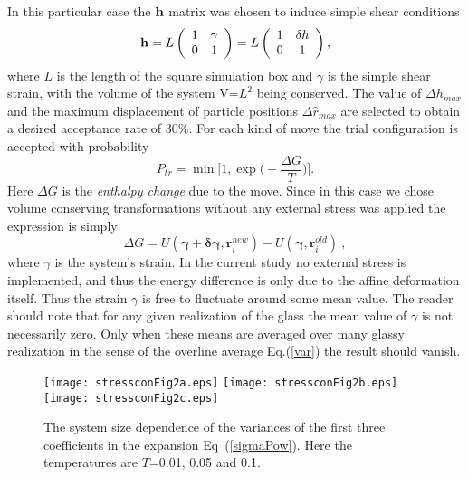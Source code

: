 \documentclass[pre,twocolumn,aps,10pt,superscriptaddress,notitlepage,nofootinbib]{revtex4-1}
\newcommand{\B}[1]{{\bm{#1}}}
\begin{document}
In this particular case the  ${\bf h}$ matrix was chosen to induce simple shear conditions
\begin{equation}
{\bf h}=L\left(
\begin{array}{c c}
1&\gamma \\
0&1
\end{array}
\right)
=L\left(
\begin{array}{c c}
1&\delta h\\
0&1
\end{array}
\right),
\label{hG}
\end{equation}
where $L$ is the length of the square simulation box and $\gamma$ is the simple shear strain, with the volume of the system V=$L^2$ being conserved.
The value of $\Delta h_{max}$  and the maximum displacement of particle positions $\Delta \hat{ r}_{max}$ are selected to obtain a desired acceptance rate of $30\%$.
For each kind of move the trial configuration is accepted with probability
\begin{equation}
P_{tr}=\min \bigg[1,\exp\bigg(-\frac{\Delta G}{T}\bigg)\bigg].
\label{trial}
\end{equation}
Here $\Delta G$ is the {\em enthalpy change} due to the move. Since in this case we chose volume conserving transformations without any external stress was applied the expression is simply
\begin{equation}
\Delta G=U(\B \gamma+\B {\delta \gamma},\B r_i^{new})-
U(\B \gamma,\B r_i^{old})\ ,
\label{entG}
\end{equation}
where $\gamma$ is the system's strain.
In the current study no external stress is implemented, and thus the energy difference is only due to the affine deformation itself. Thus the strain $\gamma$ is free to fluctuate around some mean value. The reader should
note that for any given realization of the glass the mean value of $\gamma$ is not necessarily zero. Only
when these means are averaged over many glassy realization in the sense of the overline average Eq.(\ref{var}) the result should vanish.
  \begin{figure}
\texttt{[image: stressconFig2a.eps]}
\texttt{[image: stressconFig2b.eps]}
\texttt{[image: stressconFig2c.eps]}
 \caption{The system size dependence of the variances of the first three coefficients in the expansion Eq~(\ref{sigmaPow}). Here the temperatures are $T$=0.01, 0.05 and 0.1.}
 \label{Nfig}
 \end{figure}
\end{document}
